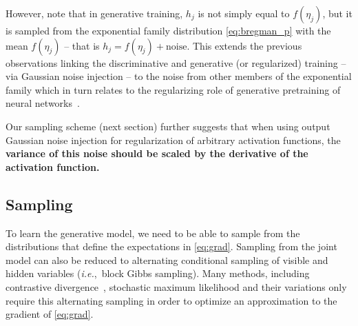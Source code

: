 \documentclass[twoside]{article}
\theoremstyle{plain}
\theoremstyle{definition}
\theoremstyle{remark}
\newcommand{\ie}[0]{\emph{i.e.},~}
\newcommand{\eg}[0]{\emph{e.g.},~}
\newcommand{\aka}[0]{a.k.a.~}
\newcommand{\refEq}[1]{\cref{#1}}%
\newcommand{\boldit}[1]{\ensuremath{#1}}
\newcommand{\sfit}[1]{\ensuremath{#1}}
\newcommand{\xx}[0]{\ensuremath{\boldit{v}}}%
\newcommand{\x}[0]{\ensuremath{{v}}}%
\newcommand{\yy}[0]{\ensuremath{\boldit{h}}}%
\newcommand{\y}[0]{\ensuremath{{h}}}%
\newcommand{\pp}[0]{\ensuremath{\sfit{p}}}%
\newcommand{\ff}[0]{\ensuremath{\sfit{f}}}%
\begin{document}
However, note that in generative training, $\y_j$ is not simply equal to $\ff(\eta_j)$, but it is sampled from the exponential family distribution \refEq{eq:bregman_p} with the mean $\ff(\eta_j)$ -- that is $\y_j = \ff(\eta_j) + \text{noise}$.
This %
extends the previous observations linking the discriminative and generative (or regularized) training -- via Gaussian noise injection -- to the noise from other members of the exponential family \citep[\eg][]{an1996effects,vincent2008extracting,bishop1995training} which in turn relates to the regularizing role of generative pretraining of neural networks~\citep{erhan2010does}. 

Our sampling scheme (next section) further suggests that
when using output Gaussian noise injection for regularization of arbitrary activation functions, the \textbf{variance of this noise should be scaled by the derivative of the activation function.}


\subsection{Sampling}\label{sec:sampling}
To learn the generative model, we need to be able to sample from the distributions that define the expectations in \refEq{eq:grad}.
Sampling from the joint model can also be reduced to alternating conditional sampling of visible and hidden variables (\ie block Gibbs sampling). Many methods, including contrastive divergence~\citep[CD;][]{hinton2002training}, stochastic maximum likelihood \citep[\aka persistent CD][]{tieleman2008training} and their variations \citep[\eg][]{tieleman2009using,breuleux2011quickly} only require this alternating sampling
in order to optimize an approximation to the gradient of \refEq{eq:grad}. 
\end{document}
